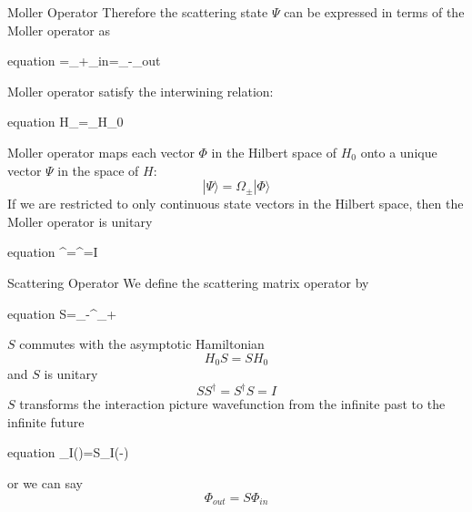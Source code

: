\documentclass{beamer}
\begin{document}
	\begin{frame}{Moller Operator}
		Therefore the scattering state $\Psi$ can be expressed in terms of the Moller operator as
		\begin{empheq}[box=\fbox]{equation}
			\Psi=\Omega_+\Phi_{in}=\Omega_-\Phi_{out}
		\end{empheq}
		Moller operator satisfy the interwining relation:
		\begin{empheq}[box=\fbox]{equation}
			H\Omega_\pm=\Omega_\pm H_0
		\end{empheq}
		Moller operator maps each vector $\Phi$ in the Hilbert space of $H_0$ onto a unique vector $\Psi$ in the space of $H$:
		\begin{equation}
			|\Psi\rangle=\Omega_\pm|\Phi\rangle
		\end{equation}
		If we are restricted to only continuous state vectors in the Hilbert space, then the Moller operator is unitary
		\begin{empheq}[box=\fbox]{equation}
			\Omega\Omega^\dagger=\Omega^\dagger\Omega=I
		\end{empheq}
	\end{frame}
	\begin{frame}{Scattering Operator}
		We define the scattering matrix operator by
		\begin{empheq}[box=\fbox]{equation}
			S=\Omega_-^\dagger\Omega_+
		\end{empheq}
		$S$ commutes with the asymptotic Hamiltonian
		\begin{equation}
			H_0S=SH_0
		\end{equation}
		and $S$ is unitary
		\begin{equation}
			SS^\dagger=S^\dagger S=I
		\end{equation}
		$S$ transforms the interaction picture wavefunction from the infinite past to the infinite future
		\begin{empheq}[box=\fbox]{equation}
			\Psi_I(\infty)=S\Psi_I(-\infty)
		\end{empheq}
		or we can say
		\begin{equation}
			\Phi_{out}=S\Phi_{in}
		\end{equation}
	\end{frame}
\end{document}
